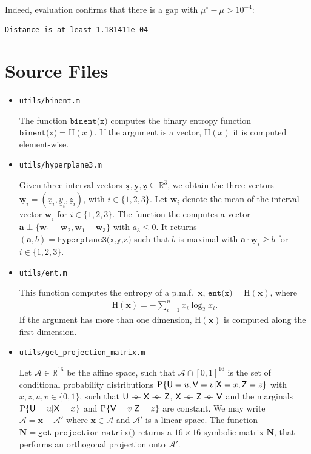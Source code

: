 \documentclass[a4paper,12pt]{scrartcl}
\newcommand{\Pcond}[2]{\ensuremath{\mathrm{P}}\{#1|#2\}}
\newcommand{\ul}[1]{\ensuremath{\underline{#1}}}
\newcommand{\mat}[1]{\ensuremath{\mathbf{#1}}}
\newcommand{\vt}[1]{\ensuremath{\mathbf{#1}}}
\newcommand{\rv}[1]{\ensuremath{\mathsf{\uppercase{#1}}}}
\newcommand{\AAA}{\ensuremath{\mathcal A}}
\newcommand{\RR}{\ensuremath{\mathbb R}}
\def\barcirc{\mathrel{\barcirci}}
\def\barcirci{{%
    \setbox0\hbox{\ensuremath{\relbar\!\!\relbar}}%
    \rlap{\hbox to \wd0{\hss\ensuremath{\circ}\hss}}\box0
}}
\newcommand{\mkv}{\ensuremath{\barcirc}}
\newcommand{\binEnt}[1]{\ensuremath{\mathrm{H}(#1)}}
\begin{document}


Indeed, evaluation confirms that there is a gap with $\ul \mu^\circ - \ul \mu > 10^{-4}$:

\texttt{Distance is at least 1.181411e-04}

\section{Source Files}
\label{sec:source-files}

\begin{itemize}
\item \texttt{utils/binent.m}

  The function $\texttt{binent(x)}$ computes the binary entropy function $\texttt{binent(x)} = \binEnt{x}$. If the argument is a vector, $\binEnt{x}$ it is computed element-wise.

  
\item \texttt{utils/hyperplane3.m}

  Given three interval vectors $\ul{\vt x}, \ul{\vt y}, \ul{\vt z} \subseteq \RR^3$, we obtain the three vectors $\ul{\vt w}_i = (\ul{x}_i, \ul{y}_i, \ul{z}_i)$, with $i \in \{1,2,3\}$.
  Let $\vt w_i$ denote the mean of the interval vector $\ul{\vt w}_i$ for $i \in \{1,2,3\}$. The function the computes a vector $\vt a \perp \{\vt w_1 - \vt w_2, \vt w_1 - \vt w_3\}$ with $a_3 \le 0$. It returns $(\vt a, b) = \texttt{hyperplane3(x,y,z)}$ such that $b$ is maximal with $\vt a \cdot \ul{\vt w}_i \ge b$ for $i \in \{1,2,3\}$.
  
  
\item \texttt{utils/ent.m}

  This function computes the entropy of a p.m.f.\ $\vt x$, $\texttt{ent(x)} = \binEnt{\vt x}$, where
  \begin{align}
    \binEnt{\vt x} = - \sum_{i=1}^{n} x_i \log_2 x_i .
  \end{align}
  If the argument has more than one dimension, $\binEnt{\vt x}$ is computed along the first dimension.

  
\item \texttt{utils/get\_projection\_matrix.m}

  Let $\AAA \in \RR^{16}$ be the affine space, such that $\AAA \cap [0,1]^{16}$ is the set of conditional probability distributions $\Pcond{\rv u=u, \rv v=v}{\rv x=x, \rv z=z}$ with $x,z,u,v \in \{0,1\}$, such that $\rv u \mkv \rv x \mkv \rv z$, $\rv x \mkv \rv z \mkv \rv v$ and the marginals $\Pcond{\rv u=u}{\rv x=x}$ and $\Pcond{\rv v=v}{\rv z=z}$ are constant.
  We may write $\AAA = \vt x + \AAA'$ where $\vt x \in \AAA$ and $\AAA'$ is a linear space.
  The function $\mat N = \texttt{get\_projection\_matrix()}$ returns a $16 \times 16$ symbolic matrix $\mat N$, that performs an orthogonal projection onto $\AAA'$.
  

\end{itemize}
\end{document}
